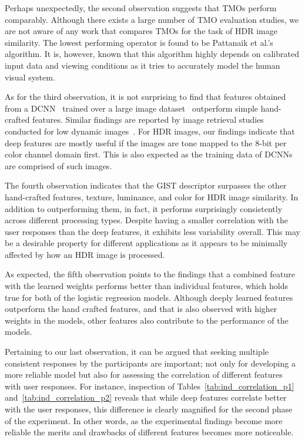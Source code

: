 Perhaps unexpectedly, the second observation suggests that TMOs perform comparably. Although there exists a large number of TMO evaluation studies, we are not aware of any work that compares TMOs for the task of HDR image similarity. The lowest performing operator is found to be Pattanaik et
al.'s~\cite{pattanaik2000time} algorithm. It is, however, known that
this algorithm highly depends on calibrated input data and viewing
conditions as it tries to accurately model the human visual system.

As for the third observation, it is not surprising to find that 
features obtained from a DCNN~\cite{simonyan2014very} trained over a large image dataset~\cite{russakovsky2015imagenet} outperform simple hand-crafted
features. Similar findings are reported by image retrieval studies
conducted for low dynamic images~\cite{wan2014deep,gordo2016deep}. For
HDR images, our findings indicate that deep features are mostly useful if the images are tone mapped to the 8-bit per color channel domain
first. This is also expected as the training data of DCNNs are comprised of such images.

The fourth observation indicates that the GIST descriptor surpasses the other hand-crafted features, texture, luminance, and color for HDR image similarity. In addition to outperforming them, in fact, it performs surprisingly consistently across different processing types. Despite having a smaller correlation with the user responses than the deep features, it exhibits less variability overall. This may be a desirable property for different applications as it appears to be minimally affected by how an HDR image is processed.

As expected, the fifth observation points to the findings that a combined feature with the learned weights performs better than individual features, which holds true for both of the logistic regression models. Although deeply learned features outperform the hand crafted features, and that is also observed with higher weights in the models, other features also contribute to the performance of the models. 

Pertaining to our last observation, it can be argued that seeking multiple
consistent responses by the participants are important; not only for
developing a more reliable model but also for assessing the correlation
of different features with user responses. For instance, inspection of
Tables~\ref{tab:ind_correlation_p1} and~\ref{tab:ind_correlation_p2} reveals that while deep features correlate better with the user responses, this difference is clearly magnified for the second phase of the experiment. In other words, as the experimental findings become more reliable the merits and drawbacks of different features becomes more noticeable.